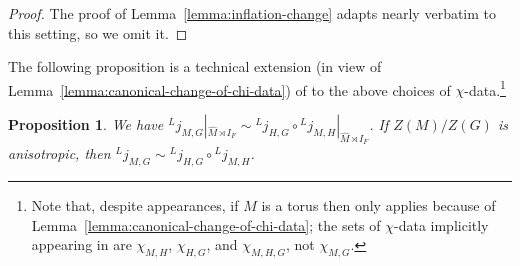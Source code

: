 \documentclass[reqno]{amsart}
\numberwithin{equation}{subsection}
\newcommand{\wh}[1]{\widehat{#1}}
\newcommand{\ld}{{}^L}
\newtheorem{prop}[thm]{Proposition}
\theoremstyle{remark}
\numberwithin{equation}{subsection}
\numberwithin{figure}{subsection}
\begin{document}
\begin{proof}
The proof of Lemma~\ref{lemma:inflation-change} adapts nearly verbatim to this setting, so we omit it.
\end{proof}

The following proposition is a technical extension (in view of Lemma~\ref{lemma:canonical-change-of-chi-data}) of \cite[Proposition 6.9]{Kal21a} to the above choices of $\chi$-data.\footnote{Note that, despite appearances, \cite[Proposition 6.9]{Kal21a} if $M$ is a torus then only applies because of Lemma~\ref{lemma:canonical-change-of-chi-data}; the sets of $\chi$-data implicitly appearing in \cite[Proposition 6.9]{Kal21a} are $\chi_{M,H}$, $\chi_{H,G}$, and $\chi_{M,H,G}$, not $\chi_{M,G}$.}

\begin{prop}\label{prop:composition-of-canonical-l-embeddings}
We have $\ld j_{M,G}|_{\wh M \rtimes I_F} \sim \ld j_{H,G} \circ \ld j_{M,H}|_{\wh M \rtimes I_F}$. If $Z(M)/Z(G)$ is anisotropic, then $\ld j_{M,G} \sim \ld j_{H,G} \circ \ld j_{M,H}$.
\end{prop}
\end{document}
